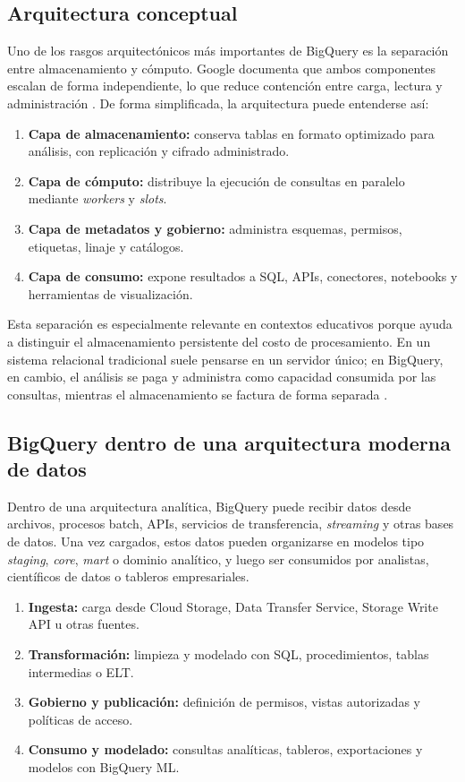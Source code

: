 \documentclass[12pt]{article}
\begin{document}
\subsection{Arquitectura conceptual}
Uno de los rasgos arquitectónicos más importantes de BigQuery es la separación entre almacenamiento y cómputo. Google documenta que ambos componentes escalan de forma independiente, lo que reduce contención entre carga, lectura y administración \cite{gcp_storage_overview}. De forma simplificada, la arquitectura puede entenderse así:

\begin{enumerate}[label=\textbf{A\arabic*.}, leftmargin=*]
\item \textbf{Capa de almacenamiento:} conserva tablas en formato optimizado para análisis, con replicación y cifrado administrado.
\item \textbf{Capa de cómputo:} distribuye la ejecución de consultas en paralelo mediante \textit{workers} y \textit{slots}.
\item \textbf{Capa de metadatos y gobierno:} administra esquemas, permisos, etiquetas, linaje y catálogos.
\item \textbf{Capa de consumo:} expone resultados a SQL, APIs, conectores, notebooks y herramientas de visualización.
\end{enumerate}

Esta separación es especialmente relevante en contextos educativos porque ayuda a distinguir el almacenamiento persistente del costo de procesamiento. En un sistema relacional tradicional suele pensarse en un servidor único; en BigQuery, en cambio, el análisis se paga y administra como capacidad consumida por las consultas, mientras el almacenamiento se factura de forma separada \cite{gcp_bigquery_pricing,gcp_bigquery_editions}.

\subsection{BigQuery dentro de una arquitectura moderna de datos}
Dentro de una arquitectura analítica, BigQuery puede recibir datos desde archivos, procesos batch, APIs, servicios de transferencia, \textit{streaming} y otras bases de datos. Una vez cargados, estos datos pueden organizarse en modelos tipo \textit{staging}, \textit{core}, \textit{mart} o dominio analítico, y luego ser consumidos por analistas, científicos de datos o tableros empresariales.

\begin{enumerate}[label=\textbf{F\arabic*.}, leftmargin=*]
\item \textbf{Ingesta:} carga desde Cloud Storage, Data Transfer Service, Storage Write API u otras fuentes.
\item \textbf{Transformación:} limpieza y modelado con SQL, procedimientos, tablas intermedias o ELT.
\item \textbf{Gobierno y publicación:} definición de permisos, vistas autorizadas y políticas de acceso.
\item \textbf{Consumo y modelado:} consultas analíticas, tableros, exportaciones y modelos con BigQuery ML.
\end{enumerate}
\end{document}
